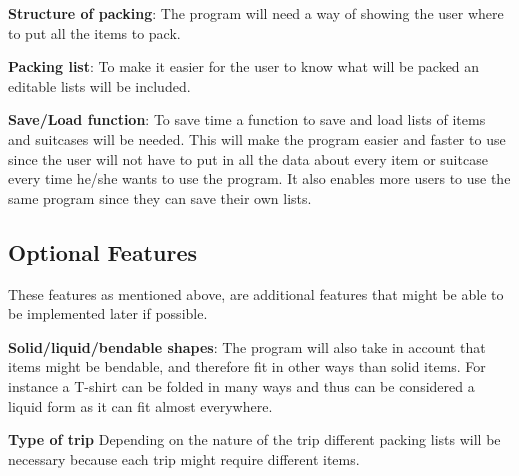 \textbf{Structure of packing}:
The program will need a way of showing the user where to put all the items to pack.
\newline

\textbf{Packing list}:
To make it easier for the user to know what will be packed an editable lists will be included.
\newline

\textbf{Save/Load function}:
To save time a function to save and load lists of items and suitcases will be needed. This will make the program easier and faster to use since the user will not have to put in all the data about every item or suitcase every time he/she wants to use the program. It also enables more users to use the same program since they can save their own lists.
\newline

\subsection{Optional Features}
These features as mentioned above, are additional features that might be able to be implemented later if possible.\newline

\textbf{Solid/liquid/bendable shapes}:
The program will also take in account that items might be bendable, and therefore fit in other ways than solid items. For instance a T-shirt can be folded in many ways and thus can be considered a liquid form as it can fit almost everywhere.
\newline

\textbf{Type of trip}
Depending on the nature of the trip different packing lists will be necessary because each trip might require different items.
\newline
